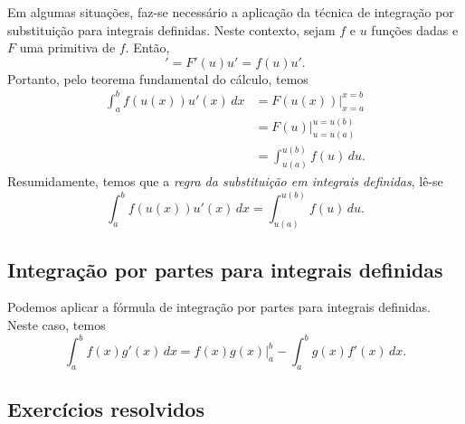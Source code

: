Em algumas situações, faz-se necessário a aplicação da técnica de integração por substituição para integrais definidas. Neste contexto, sejam $f$ e $u$ funções dadas e $F$ uma primitiva de $f$. Então,
\begin{equation}
  [F(u)]' = F'(u)u' = f(u)u'.
\end{equation}
Portanto, pelo teorema fundamental do cálculo, temos
\begin{align}
  \int_a^b f(u(x))u'(x)\,dx &= F(u(x))|_{x=a}^{x=b}\\
                            &= F(u)|_{u=u(a)}^{u=u(b)}\\
                            &= \int_{u(a)}^{u(b)} f(u)\,du.
\end{align}
Resumidamente, temos que a \emph{regra da substituição em integrais definidas}, lê-se
\begin{equation}
  \int_a^b f(u(x))u'(x)\,dx = \int_{u(a)}^{u(b)} f(u)\,du.
\end{equation}

\subsection{Integração por partes para integrais definidas}

Podemos aplicar a fórmula de integração por partes para integrais definidas. Neste caso, temos
\begin{equation}
  \int_a^b f(x)g'(x)\,dx = f(x)g(x)|_{a}^b - \int_a^b g(x)f'(x)\,dx.
\end{equation}

\subsection*{Exercícios resolvidos}

